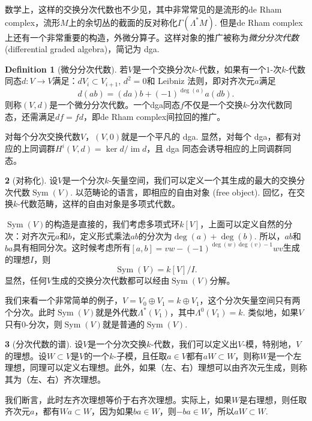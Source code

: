 \documentclass[11pt]{article}
\theoremstyle{definition}
\newtheorem{para}{}[section]
\newtheorem{defi}[para]{Definition}
\theoremstyle{plain}
\begin{document}
数学上，这样的交换分次代数也不少见，其中非常常见的是流形的de Rham complex，流形$M$上的余切丛的截面的反对称化$\Gamma(\Lambda^*M)$. 但是de Rham complex上还有一个非常重要的构造，外微分算子。这样对象的推广被称为\textit{微分分次代数} (differential graded algebra)，简记为 dga. 

\begin{defi}[微分分次代数]
    若$V$是一个交换分次$k$-代数，如果有一个$1$-次$k$-代数同态$d:V\to V$满足：$dV_i\subset V_{i+1}$, $d^2=0$和 Leibniz 法则，即对齐次元$a$满足
    \[
        d(ab)=(da)b+(-1)^{\deg(a)}a(db).
    \]
    则称$(V,d)$是一个微分分次代数。一个dga同态$f$不仅是一个交换$k$-分次代数同态，还需满足$df=fd$，即de Rham complex间拉回的推广。
\end{defi}

对每个分次交换代数$V$，$(V,0)$就是一个平凡的 dga. 
显然，对每个 dga，都有对应的上同调群$H^i(V,d)=\ker d/\operatorname{im} d$，且 dga 同态会诱导相应的上同调群同态。

\begin{para}[对称化]
    设$V$是一个分次$k$-矢量空间，我们可以定义一个其生成的最大的交换分次代数$\operatorname{Sym}(V)$. 以范畴论的语言，即相应的自由对象 (free object). 回忆，在交换$k$-代数范畴，这样的自由对象是多项式代数。

    $\operatorname{Sym}(V)$的构造是直接的，我们考虑多项式环$k[V]$，上面可以定义自然的分次：对齐次元$a$和$b$，定义形式乘法$ab$的分次为$\deg(a)+\deg(b)$. 所以，$ab$和$ba$具有相同分次。这时候考虑所有$[a,b]=vw-(-1)^{\deg(w)\deg(v)-1}wv$生成的理想$I$，则
    \[
        \operatorname{Sym}(V)=k[V]/I.
    \]
    显然，任何$V$生成的交换分次代数都可以经由$\operatorname{Sym}(V)$分解。
\end{para}

我们来看一个非常简单的例子，$V=V_0\oplus V_1=k\oplus V_1$，这个分次矢量空间只有两个分次。此时$\operatorname{Sym}(V)$就是外代数$\Lambda^*(V_1)$，其中$\Lambda^0(V_1)=k$. 类似地，如果$V$只有$0$-分次，则$\operatorname{Sym}(V)$就是普通的$\operatorname{Sym}(V)$.

\begin{para}[分次代数的谱]
    设$V$是一个分次交换$k$-代数，我们可以定义出$V$-模，特别地，$V$的理想。设$W\subset V$是$V$的一个$k$-子模，且任取$a\in V$都有$aW\subset W$，则称$W$是一个左理想，同理可以定义右理想。此外，如果（左、右）理想可以由齐次元生成，则称其为（左、右）齐次理想。

    我们断言，此时左齐次理想等价于右齐次理想。实际上，如果$W$是右理想，则任取齐次元$a$，都有$Wa\subset W$，因为如果$ba\in W$，则$-ba\in W$，所以$aW\subset W$.
\end{para}
\end{document}
